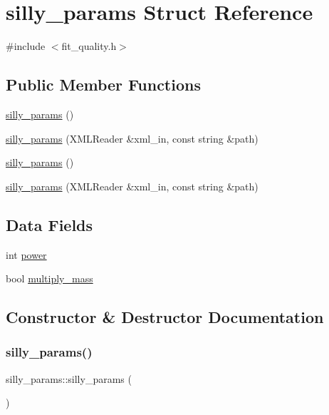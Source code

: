 \hypertarget{structsilly__params}{}\section{silly\+\_\+params Struct Reference}
\label{structsilly__params}


{\ttfamily \#include $<$fit\+\_\+quality.\+h$>$}

\subsection*{Public Member Functions}
\begin{DoxyCompactItemize}
\item 
\mbox{\hyperlink{structsilly__params_af6ada23045b279ed7b0853b4017dd286}{silly\+\_\+params}} ()
\item 
\mbox{\hyperlink{structsilly__params_ac35c06fe1d98266d231e8315a2f0a5b6}{silly\+\_\+params}} (X\+M\+L\+Reader \&xml\+\_\+in, const string \&path)
\item 
\mbox{\hyperlink{structsilly__params_af6ada23045b279ed7b0853b4017dd286}{silly\+\_\+params}} ()
\item 
\mbox{\hyperlink{structsilly__params_ac35c06fe1d98266d231e8315a2f0a5b6}{silly\+\_\+params}} (X\+M\+L\+Reader \&xml\+\_\+in, const string \&path)
\end{DoxyCompactItemize}
\subsection*{Data Fields}
\begin{DoxyCompactItemize}
\item 
int \mbox{\hyperlink{structsilly__params_af5e805a69bdd87303934f29015317281}{power}}
\item 
bool \mbox{\hyperlink{structsilly__params_a07402b5ea15bb6d424fd8f3af9baae2a}{multiply\+\_\+mass}}
\end{DoxyCompactItemize}


\subsection{Constructor \& Destructor Documentation}
\mbox{\label{structsilly__params_af6ada23045b279ed7b0853b4017dd286}} 
\subsubsection{\texorpdfstring{silly\_params()}{silly\_params()}\hspace{0.1cm}{\footnotesize\ttfamily [1/4]}}
{\footnotesize\ttfamily silly\+\_\+params\+::silly\+\_\+params (\begin{DoxyParamCaption}{ }\end{DoxyParamCaption})\hspace{0.3cm}{\ttfamily [inline]}}

